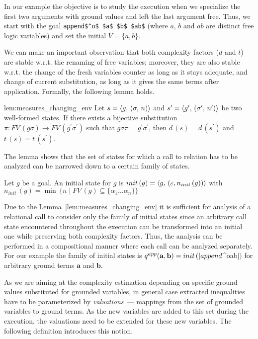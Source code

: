 In our example the objective is to study the execution when we specialize the first two arguments with
ground values and left the last argument free. Thus, we start with the goal \lstinline|append$^o$ $a$ $b$ $ab$|
(where $a$, $b$ and $ab$ are distinct free logic variables) and set the initial $V = \{ a, b \}$.

We can make an important observation that both complexity factors ($d$ and $t$) are stable w.r.t. the renaming of
free variables; moreover, they are also stable w.r.t. the change of the fresh variables counter as long as it stays
adequate, and change of current substitution, as long as it gives the same terms after application.
Formally, the following lemma holds.

\begin{replemma}{lem:measures_changing_env}
Let $s = \langle g ,\, (\sigma ,\, n) \rangle$ and $s' = \langle g^\prime ,\, (\sigma^\prime ,\, n^\prime) \rangle$ be two well-formed states.
If  there exists a bijective substitution $\pi \colon FV\,(g \sigma) \to FV\,(g^\prime \sigma^\prime)$ such that
$g \sigma \pi = g^\prime \sigma^\prime $, then $d\,(s) = d\,(s^\prime)$ and $t\,(s) = t\,(s^\prime)$.
\end{replemma}

The lemma shows that the set of states for which a call to relation has to be analyzed can
be narrowed down to a certain family of states. 

\begin{definition} Let $g$ be a goal. An initial state for $g$ is $init\,(g)=\langle g ,\, (\varepsilon, n_{init}\,(g)) \rangle $
with $ n_{init}\,(g) = \min\, \{ n \mid FV\,(g) \subseteq \{ \alpha_1\dots\alpha_n \} \} $
\end{definition}

Due to the Lemma~\ref{lem:measures_changing_env} it is sufficient for analysis of a relational call to consider only the family of initial states since an arbitrary call state
encountered throughout the execution can be transformed into an initial one while preserving both
complexity factors. Thus, the analysis can be performed in a compositional manner where each call can be analyzed separately.
For our example the family of initial states is $q^{app}(\mathbf{a}, \mathbf{b}) = init\,(\lstinline|append$^o$ $$ $$ $ab$|)$ for arbitrary ground
terms $\mathbf{a}$ and $\mathbf{b}$.

As we are aiming at the complexity estimation depending on specific ground values substituted for grounded variables, in general case extracted
inequalities have to be parameterized by \emph{valuations}~--- mappings from the set of grounded variables to ground terms. As the new variables
are added to this set during the execution, the valuations need to be extended for these new variables. The following definition introduces this notion.

